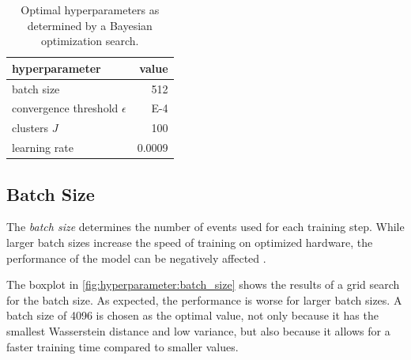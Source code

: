 \begin{table}
    \centering
    \caption{
      Optimal hyperparameters as determined by a Bayesian optimization search.
    }
    \label{tab:hyperparameters:initial}
    \begin{tabular}{l r}
        \toprule
        hyperparameter & {value} \\
        \midrule
        batch size & \num{512} \\
        convergence threshold $\epsilon$ & \num{E-4} \\
        clusters $J$ & \num{100} \\
        learning rate & \num{0.0009} \\
        \bottomrule
    \end{tabular}
\end{table}


\FloatBarrier
\clearpage %
\subsection{Batch Size}
The \emph{batch size} determines the number of events used for each training step.
While larger batch sizes increase the speed of training
on optimized hardware,
the performance of the model can be negatively affected \cite{batchsize_kandel}.

The boxplot in \autoref{fig:hyperparameter:batch_size} shows the results of a grid search for the batch size.
As expected, the performance is worse for larger batch sizes.
A batch size of \num{4096} is chosen as the optimal value,
  not only because it has
    the smallest Wasserstein distance
    and low variance,
  but also because it allows for a faster training time
    compared to smaller values.

